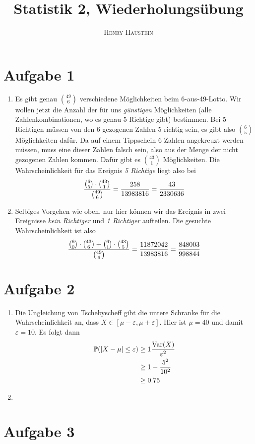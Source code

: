 \documentclass{article}
\title{\textbf{Statistik 2, Wiederholungsübung}}
\author{\textsc{Henry Haustein}}
\date{}
\DeclareMathOperator{\Var}{Var}
\begin{document}
	\maketitle
	
	\section*{Aufgabe 1}
	\begin{enumerate}[label=(\alph*)]
		\item Es gibt genau $\binom{49}{6}$ verschiedene Möglichkeiten beim 6-aus-49-Lotto. Wir wollen jetzt die Anzahl der für uns \textit{günstigen} Möglichkeiten (alle Zahlenkombinationen, wo es genau 5 Richtige gibt) bestimmen. Bei 5 Richtigen müssen von den 6 gezogenen Zahlen 5 richtig sein, es gibt also $\binom{6}{5}$ Möglichkeiten dafür. Da auf einem Tippschein 6 Zahlen angekreuzt werden müssen, muss eine dieser Zahlen falsch sein, also aus der Menge der nicht gezogenen Zahlen kommen. Dafür gibt es $\binom{43}{1}$ Möglichkeiten. Die Wahrscheinlichkeit für das Ereignis \textit{5 Richtige} liegt also bei
		\begin{align}
			\frac{\binom{6}{5}\cdot\binom{43}{1}}{\binom{49}{6}} = \frac{258}{13983816} = \frac{43}{2330636} \notag
		\end{align}
		\item Selbiges Vorgehen wie oben, nur hier können wir das Ereignis in zwei Ereignisse \textit{kein Richtiger} und \textit{1 Richtiger} aufteilen. Die gesuchte Wahrscheinlichkeit ist also
		\begin{align}
			\frac{\binom{6}{0}\cdot\binom{43}{6} + \binom{6}{1}\cdot\binom{43}{5}}{\binom{49}{6}} = \frac{11872042}{13983816} = \frac{848003}{998844} \notag
		\end{align}
	\end{enumerate}
	
	\section*{Aufgabe 2}
	\begin{enumerate}[label=(\alph*)]
		\item Die Ungleichung von Tschebyscheff gibt die untere Schranke für die Wahrscheinlichkeit an, dass $X\in [\mu-\varepsilon,\mu+\varepsilon]$. Hier ist $\mu=40$ und damit $\varepsilon=10$. Es folgt dann
		\begin{align}
			\mathbb{P}(\vert X-\mu\vert \le \varepsilon) &\ge 1\frac{\Var(X)}{\varepsilon^2} \notag \\
			&\ge 1- \frac{5^2}{10^2} \notag \\
			&\ge 0.75 \notag
		\end{align}
		\item 
	\end{enumerate}

	\section*{Aufgabe 3}
\end{document}
